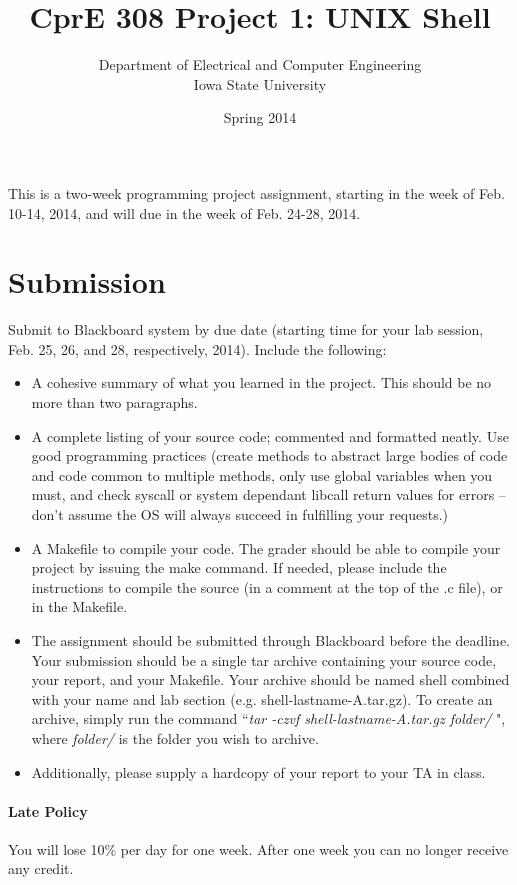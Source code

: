 \documentclass[letterpaper,10pt]{article}
\title{CprE 308 Project 1: UNIX Shell}
\author{Department of Electrical and Computer Engineering \\ Iowa State University}
\date{Spring 2014}
\begin{document}
\maketitle

This is a two-week programming project assignment, starting in the week of Feb. 10-14, 2014, 
and will due in the week of Feb. 24-28, 2014.

\section{Submission}
Submit to Blackboard system by due date (starting time for your lab session, Feb. 25, 26, and 28, respectively, 2014). 
Include the following:
\begin{itemize}
 \item A cohesive summary of what you learned in the project. This should be no more than two paragraphs.
 \item A complete listing of your source code; commented and formatted neatly. Use good programming practices
  (create methods to abstract large bodies of code and code common to multiple methods, only use global
  variables when you must, and check syscall or system dependant libcall return values for errors – don't assume
  the OS will always succeed in fulfilling your requests.)
 \item A Makefile to compile your code. The grader should be able to compile your project by issuing the make command. If needed, please include
 the instructions to compile the source (in a comment at the top of the .c file), or in the Makefile.
 \item The assignment should be submitted through Blackboard before the deadline. Your submission should 
 be a single tar archive containing your source code, your report, and your Makefile. 
 Your archive should be named shell combined with your name and lab section (e.g. shell-lastname-A.tar.gz). 
 To create an archive, simply run the command ``{\em tar -czvf shell-lastname-A.tar.gz folder/ }", 
 where {\em folder/ } is the folder you wish to archive.
 \item Additionally, please supply a hardcopy of your report to your TA in class.
\end{itemize}

\paragraph{Late Policy}
You will lose 10\% per day for one week. After one week you can no longer receive any credit.
\end{document}
